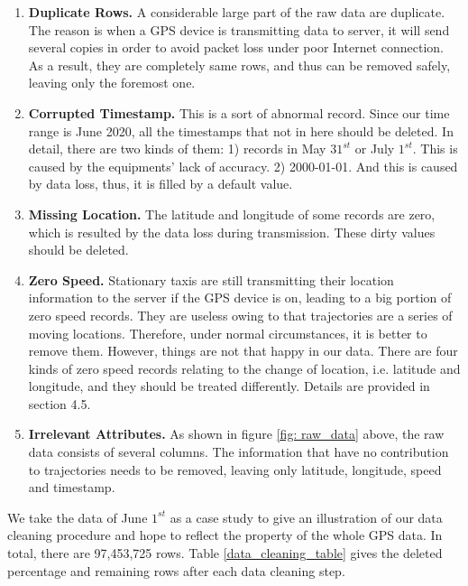 \begin{enumerate}
  \item \textbf{Duplicate Rows.} A considerable large part of the raw data are duplicate. The reason is when a GPS device is transmitting data to server, it will send several copies in order to avoid packet loss under poor Internet connection. As a result, they are completely same rows, and thus can be removed safely, leaving only the foremost one.
  \item \textbf{Corrupted Timestamp.} This is a sort of abnormal record. Since our time range is June 2020, all the timestamps that not in here should be deleted. In detail, there are two kinds of them: 1) records in May $31^{st}$ or July $1^{st}$. This is caused by the equipments' lack of accuracy. 2) 2000-01-01. And this is caused by data loss, thus, it is filled by a default value.
  \item \textbf{Missing Location.} The latitude and longitude of some records are zero, which is resulted by the data loss during transmission. These dirty values should be deleted.
  \item \textbf{Zero Speed.} Stationary taxis are still transmitting their location information to the server if the GPS device is on, leading to a big portion of zero speed records. They are useless owing to that trajectories are a series of moving locations. Therefore, under normal circumstances, it is better to remove them. However, things are not that happy in our data. There are four kinds of zero speed records relating to the change of location, i.e. latitude and longitude, and they should be treated differently. Details are provided in section 4.5.
  \item \textbf{Irrelevant Attributes.} As shown in figure \ref{fig: raw_data} above, the raw data consists of several columns. The information that have no contribution to trajectories needs to be removed, leaving only latitude, longitude, speed and timestamp.
\end{enumerate}

We take the data of June $1^{st}$ as a case study to give an illustration of our data cleaning procedure and hope to reflect the property of the whole GPS data. In total, there are 97,453,725 rows. Table \ref{data_cleaning_table} gives the deleted percentage and remaining rows after each data cleaning step.

